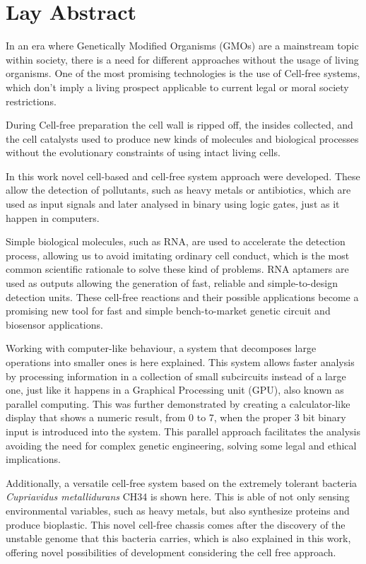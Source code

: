 \chapter{Lay Abstract}

In an era where Genetically Modified Organisms (GMOs) are a mainstream topic within society,
there is a need for different approaches without the usage of living organisms. One of the 
most promising technologies is the use of Cell-free systems, which don't imply a living prospect
applicable to current legal or moral society restrictions.

During Cell-free preparation the cell wall is ripped off, the insides collected, and the cell
catalysts used to produce new kinds of molecules and biological processes without the evolutionary
constraints of using intact living cells.

In this work novel cell-based and cell-free system approach were developed. These allow the detection
of pollutants, such as heavy metals or antibiotics, which are used as input signals and later analysed
in binary using logic gates, just as it happen in computers. 

Simple biological molecules, such as RNA, are used to accelerate the detection process, allowing us to
avoid imitating ordinary cell conduct, which is the most common scientific rationale to solve these kind 
of problems. RNA aptamers are used as outputs allowing the generation of fast, reliable and simple-to-design
detection units. These cell-free reactions and their possible applications become a promising new tool for
fast and simple bench-to-market genetic circuit and biosensor applications.

Working with computer-like behaviour, a system that decomposes large operations into smaller ones is here explained.
This system allows faster analysis by processing information in a collection of small subcircuits instead of a large
one, just like it happens in a Graphical Processing  unit (GPU), also known as parallel computing. This was further 
demonstrated by creating a calculator-like display that shows a numeric result, from 0 to 7, when the proper 3 bit 
binary input is introduced into the system. This parallel approach facilitates the analysis avoiding the need for 
complex genetic engineering, solving some legal and ethical implications.

Additionally, a versatile cell-free system based on the extremely tolerant bacteria \textit{Cupriavidus  metallidurans} CH34
is shown here. This is able of not only sensing environmental variables, such as heavy metals, but also synthesize proteins
and produce bioplastic. This novel cell-free chassis comes after the discovery of the unstable genome that this bacteria carries,
which is also explained in this work, offering novel possibilities of development considering the cell free approach.